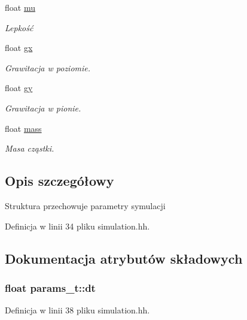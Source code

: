 \begin{DoxyCompactItemize}
float \hyperlink{structparams__t_a971359c29b2f946b477e4a1b3605fa3f}{mu}
\begin{DoxyCompactList}\small\item\em Lepkość \end{DoxyCompactList}\item 
float \hyperlink{structparams__t_a9f3f70c0cdedcb053c9d45c2e41e67b6}{gx}
\begin{DoxyCompactList}\small\item\em Grawitacja w poziomie. \end{DoxyCompactList}\item 
float \hyperlink{structparams__t_a0da484b4cc6a542875aa7b92e200f507}{gy}
\begin{DoxyCompactList}\small\item\em Grawitacja w pionie. \end{DoxyCompactList}\item 
float \hyperlink{structparams__t_afe4a59fe43565a71a0a7a155714e2af1}{mass}
\begin{DoxyCompactList}\small\item\em Masa cząstki. \end{DoxyCompactList}\end{DoxyCompactItemize}


\subsection{Opis szczegółowy}
Struktura przechowuje parametry symulacji 

Definicja w linii 34 pliku simulation.\+hh.



\subsection{Dokumentacja atrybutów składowych}
\hypertarget{structparams__t_a81fc6596e9b1446442ebf3eef2c3fb01}{}
\subsubsection[{dt}]{\setlength{\rightskip}{0pt plus 5cm}float params\+\_\+t\+::dt}\label{structparams__t_a81fc6596e9b1446442ebf3eef2c3fb01}


Definicja w linii 38 pliku simulation.\+hh.

\hypertarget{structparams__t_a9f3f70c0cdedcb053c9d45c2e41e67b6}{}
